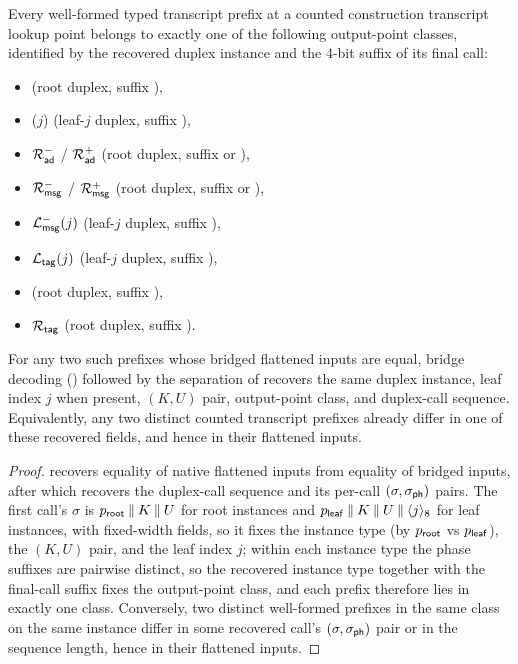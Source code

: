 \begin{corollary}
\label{cor:output-sep}
Every well-formed \TW{} typed transcript prefix at a counted
construction transcript lookup point belongs to exactly one of the
following output-point classes, identified by the recovered duplex
instance and the $4$-bit suffix of its final call:
\begin{itemize}
\item \Rinit (root duplex, suffix \siginit),
\item \Linit($j$) (leaf-$j$ duplex, suffix \siginit),
\item $\mathcal{R}_{\mathsf{ad}}^-$ / $\mathcal{R}_{\mathsf{ad}}^+$ (root duplex, suffix \sigadmore or \sigadlast),
\item $\mathcal{R}_{\mathsf{msg}}^-$ / $\mathcal{R}_{\mathsf{msg}}^+$ (root duplex, suffix \sigmsgmore or \sigmsglast),
\item $\mathcal{L}_{\mathsf{msg}}^-(j)$ (leaf-$j$ duplex, suffix \sigmsgmore),
\item $\mathcal{L}_{\mathsf{tag}}(j)$ (leaf-$j$ duplex, suffix \sigmsglast),
\item \Ragg (root duplex, suffix \sigaggmore),
\item $\mathcal{R}_{\mathsf{tag}}$ (root duplex, suffix \sigagglast).
\end{itemize}
For any two such prefixes whose bridged flattened inputs are equal,
bridge decoding () followed by the separation of
 recovers the same duplex
instance, leaf index $j$ when present, $(K, U)$ pair, output-point
class, and duplex-call sequence. Equivalently, any two distinct counted
transcript prefixes already differ in one of these recovered fields, and
hence in their flattened inputs.
\end{corollary}

\begin{proof}
 recovers equality of native flattened inputs
from equality of bridged inputs, after which 
recovers the duplex-call sequence and its per-call
$(\sigma, \sigph)$ pairs. The first call's $\sigma$ is
$p_{\mathsf{root}} \mathbin{\|} K \mathbin{\|} U$ for root instances and
$p_{\mathsf{leaf}} \mathbin{\|} K \mathbin{\|} U \mathbin{\|} \langle j \rangle_8$ for leaf
instances, with fixed-width fields, so it fixes the instance type (by
$p_{\mathsf{root}}$ vs $p_{\mathsf{leaf}}$), the $(K, U)$ pair, and the leaf index $j$;
within each instance type the phase suffixes are pairwise distinct, so the
recovered instance type together with the final-call suffix fixes the
output-point class, and each prefix therefore lies in exactly one class.
Conversely, two distinct well-formed prefixes in the same class on the
same instance differ in some recovered call's $(\sigma, \sigph)$ pair
or in the
sequence length, hence in their flattened inputs.
\end{proof}


